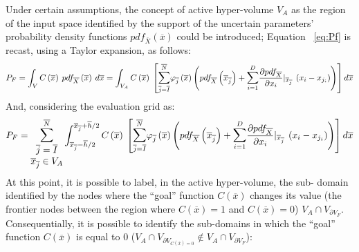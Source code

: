 Under certain assumptions, the concept of active hyper-volume
$V_{A}$ as the region of the input space identified by the support of
the uncertain parameters’ probability density functions
$pdf_{\overline{X}}\left ( \overline{x} \right )$ could be introduced;
Equation ~\ref{eq:Pf} is recast, using a Taylor expansion, as follows:
 \begin{equation}
P_{F}= \int_{V} C\left ( \overline{x} \right )\: pdf_{\overline{X}}\left (
\overline{x}  \right )\: d\overline{x} =\int_{V_{A}}C\left ( \overline{x}
\right )\:
\left [
\mathlarger{\sum}_{\overline{j}=\overline{I}}^{\overline{N}}\varphi_{\overline{j}}\left (
\overline{x} \right )
\left ( pdf_{\overline{X}}\left ( \overline{x}_{\overline{j}} \right ) +
\mathlarger{\sum}_{i=1}^{D} \frac{\partial pdf_{\overline{X}}}{\partial x_{i}}|
_{\overline{x}_{\overline{j}}} \: \left ( x_{i} - x_{j_{i}} \right ) \right ) \right
] d\overline{x}
 \end{equation}
And, considering the evaluation grid as:
\begin{equation}
\label{eq:PfEq}
P_{F}= \mathlarger{\sum}_{\begin{matrix}
\overline{j}=\overline{I} \\ \overline{x}_{\overline{j}} \in V_{A} \end{matrix}}^{\overline{N}}
\int_{\overline{x}_{\overline{j}} - \overline{h}/2}^{\overline{x}_{\overline{j}} + \overline{h}/2} C\left ( \overline{x} \right )\:
\left [  \mathlarger{\sum}_{\overline{j}=\overline{I}}^{\overline{N}}\varphi_{\overline{j}}\left ( \overline{x} \right )
\left ( pdf_{\overline{X}}\left ( \overline{x}_{\overline{j}} \right ) +
\mathlarger{\sum}_{i=1}^{D} \frac{\partial pdf_{\overline{X}}}{\partial x_{i}}|_{\overline{x}_{\overline{j}}} \: \left ( x_{i} - x_{j_{i}} \right ) \right ) \right ] d\overline{x}
\end{equation}
At this point, it is possible to label, in the active hyper-volume, the sub-
domain identified by the nodes where the ``goal'' function
$C(\overline{x})$ changes its value (the frontier nodes between the
region where $C(\overline{x})=1$ and $C(\overline{x})=0$) $V_{A} \cap
V_{\partial V_{F}}$.
\\ Consequentially, it is possible to identify the sub-domains in which the  ``goal''  function $C(\overline{x})$ is equal to $0$ ($V_{A} \cap V_{\partial V_{C(\overline{x})=0}} \notin V_{A} \cap V_{\partial V_{F}}$):

